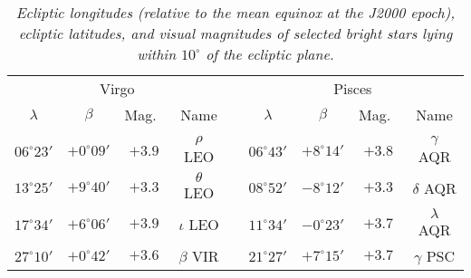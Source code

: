 \begin{table}
{\begin{tabular}{ccccccccc}
\multicolumn{4}{c}{Virgo} && \multicolumn{4}{c}{Pisces}\\
$\lambda$ & $\beta$ & Mag.\ & Name  && $\lambda$ & $\beta$ & Mag.\ & Name \\\cline{1-4}\cline{6-9}
&&&&&&&&\\[-1.75ex]
$06^\circ 23'$  & $+0^\circ 09'$ &  $+3.9$ &  $\rho$     LEO &&
$06^\circ 43'$  &$+8^\circ 14'$ &   $+3.8$ &  $\gamma$  AQR\\
$13^\circ 25'$  &$+9^\circ 40'$ &  $+3.3$ &  $\theta$   LEO &&
$08^\circ 52'$  &$-8^\circ 12'$ &  $+3.3$ &  $\delta$   AQR\\
$17^\circ 34'$ & $+6^\circ 06'$ &  $+3.9$ &  $\iota$    LEO &&
$11^\circ 34'$ &   $-0^\circ 23'$ &  $+3.7$ &  $\lambda$  AQR\\
$27^\circ 10'$ &  $+0^\circ 42'$ &  $+3.6$ &  $\beta$    VIR &&
$21^\circ 27'$ &  $+7^\circ 15'$ &  $+3.7$ &  $\gamma$   PSC\\
\end{tabular}}
\caption[{\em Table of bright stars close to the ecliptic plane.}]{\em Ecliptic longitudes (relative to the mean equinox at the J2000 epoch), ecliptic latitudes, and visual magnitudes of selected bright stars lying within $10^\circ$ of the ecliptic plane.}\label{tstar}
\end{table}

